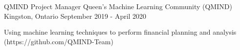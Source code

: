 

\begin{cventries}

  \cventry
    {QMIND Project Manager} %
    {Queen's Machine Learning Community (QMIND)} %
    {Kingston, Ontario} %
    {September 2019 - April 2020} %
    {
      \begin{cvitems} %
        \item {Using machine learning techniques to perform financial planning and analysis
(https://github.com/QMIND-Team)}
      \end{cvitems}
    }

\end{cventries}
